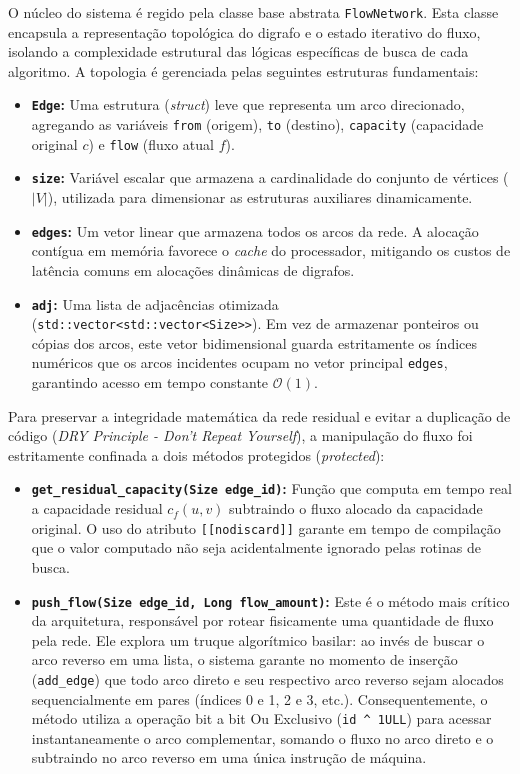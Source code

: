 \documentclass[12pt,a4paper]{article}
\begin{document}
O núcleo do sistema é regido pela classe base abstrata \lstinline{FlowNetwork}. Esta classe encapsula a representação topológica do digrafo e o estado iterativo do fluxo, isolando a complexidade estrutural das lógicas específicas de busca de cada algoritmo. A topologia é gerenciada pelas seguintes estruturas fundamentais:

\begin{itemize}
    \item \textbf{\lstinline{Edge}:} Uma estrutura (\textit{struct}) leve que representa um arco direcionado, agregando as variáveis \lstinline{from} (origem), \lstinline{to} (destino), \lstinline{capacity} (capacidade original $c$) e \lstinline{flow} (fluxo atual $f$).
    \item \textbf{\lstinline{size}:} Variável escalar que armazena a cardinalidade do conjunto de vértices ($|V|$), utilizada para dimensionar as estruturas auxiliares dinamicamente.
    \item \textbf{\lstinline{edges}:} Um vetor linear que armazena todos os arcos da rede. A alocação contígua em memória favorece o \textit{cache} do processador, mitigando os custos de latência comuns em alocações dinâmicas de digrafos.
    \item \textbf{\lstinline{adj}:} Uma lista de adjacências otimizada (\lstinline{std::vector<std::vector<Size>>}). Em vez de armazenar ponteiros ou cópias dos arcos, este vetor bidimensional guarda estritamente os índices numéricos que os arcos incidentes ocupam no vetor principal \lstinline{edges}, garantindo acesso em tempo constante $\mathcal{O}(1)$.
\end{itemize}

Para preservar a integridade matemática da rede residual e evitar a duplicação de código (\textit{DRY Principle - Don't Repeat Yourself}), a manipulação do fluxo foi estritamente confinada a dois métodos protegidos (\textit{protected}):

\begin{itemize}
    \item \textbf{\lstinline{get_residual_capacity(Size edge_id)}:} Função que computa em tempo real a capacidade residual $c_f(u,v)$ subtraindo o fluxo alocado da capacidade original. O uso do atributo \lstinline{[[nodiscard]]} garante em tempo de compilação que o valor computado não seja acidentalmente ignorado pelas rotinas de busca.
    \item \textbf{\lstinline{push_flow(Size edge_id, Long flow_amount)}:} Este é o método mais crítico da arquitetura, responsável por rotear fisicamente uma quantidade de fluxo pela rede. Ele explora um truque algorítmico basilar: ao invés de buscar o arco reverso em uma lista, o sistema garante no momento de inserção (\lstinline{add_edge}) que todo arco direto e seu respectivo arco reverso sejam alocados sequencialmente em pares (índices 0 e 1, 2 e 3, etc.). Consequentemente, o método utiliza a operação bit a bit Ou Exclusivo (\lstinline{id ^ 1ULL}) para acessar instantaneamente o arco complementar, somando o fluxo no arco direto e o subtraindo no arco reverso em uma única instrução de máquina.
\end{itemize}
\end{document}
